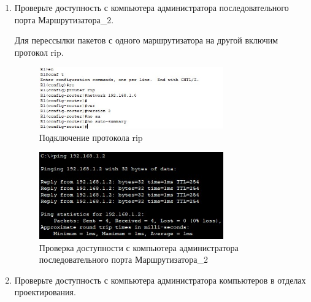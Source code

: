 \documentclass[bachelor, och, labwork]{shiza}
\begin{document}
\begin{enumerate}
    \item Проверьте доступность с компьютера администратора последовательного порта Маршрутизатора_2.
    
    Для перессылки пакетов с одного маршрутизатора на другой включим протокол rip.

    \begin{figure}[H]
        \centering      %
        \includegraphics[width=0.75\textwidth]{8}
        \caption{Подключение протокола rip}
        \label{fig:image1}
    \end{figure}

    \begin{figure}[H]
        \centering      %
        \includegraphics[width=0.75\textwidth]{9}
        \caption{Проверка доступности с компьютера администратора последовательного порта Маршрутизатора_2}
        \label{fig:image1}
    \end{figure}

    \item Проверьте доступность с компьютера администратора компьютеров в отделах проектирования.
    

\end{enumerate}
\end{document}
